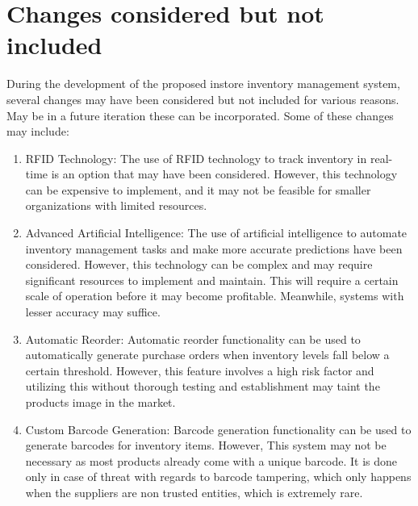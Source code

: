\section{Changes considered but not included \label{Section::Changesconsideredbutnotincluded}}
During the development of the proposed instore inventory management system, several changes may have been considered but not included for various reasons. May be in a future iteration these can be incorporated. Some of these changes may include:

\begin{enumerate}
    \item RFID Technology: The use of RFID technology to track inventory in real-time is an option that may have been considered. However, this technology can be expensive to implement, and it may not be feasible for smaller organizations with limited resources.

    \item Advanced Artificial Intelligence: The use of artificial intelligence to automate inventory management tasks and make more accurate predictions have been considered. However, this technology can be complex and may require significant resources to implement and maintain. This will require a certain scale of operation before it may become profitable. Meanwhile, systems with lesser accuracy may suffice.

    \item Automatic Reorder: Automatic reorder functionality can be used to automatically generate purchase orders when inventory levels fall below a certain threshold. However, this feature involves a high risk factor and utilizing this without thorough testing and establishment may taint the products image in the market.

    \item Custom Barcode Generation: Barcode generation functionality can be used to generate barcodes for inventory items. However, This system may not be necessary as most products already come with a unique barcode. It is done only in case of threat with regards to barcode tampering, which only happens when the suppliers are non trusted entities, which is extremely rare.

\end{enumerate}

\newpage